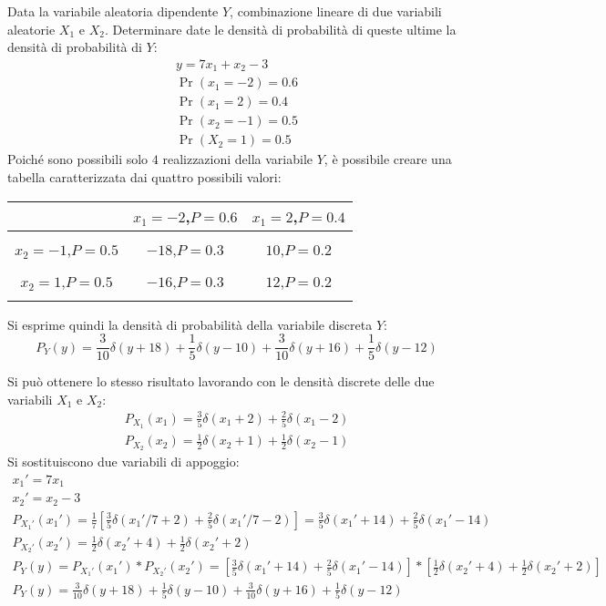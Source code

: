 \documentclass{article}
\begin{document}
Data la variabile aleatoria dipendente $Y$, combinazione lineare di due variabili aleatorie $X_1$ e $X_2$. Determinare date le densità di probabilità 
di queste ultime la densità di probabilità di $Y$:
\begin{gather*}
    y=7x_1+x_2-3\\
    \Pr(x_1=-2)=0.6\\
    \Pr(x_1=2)=0.4\\
    \Pr(x_2=-1)=0.5\\
    \Pr(X_2=1)=0.5
\end{gather*}
Poiché sono possibili solo $4$ realizzazioni della variabile $Y$, è possibile creare una tabella caratterizzata dai quattro possibili valori:
\begin{center}
    \begin{tabular}{c|c|c|}
        &$x_1=-2$,$P=0.6$&$x_1=2$,$P=0.4$\\
        \hline\\
        $x_2=-1$,$P=0.5$&$-18$,$P=0.3$&$10$,$P=0.2$\\
        \hline\\
        $x_2=1$,$P=0.5$ &$-16$,$P=0.3$ &$12$,$P=0.2$\\
        \hline\\
    \end{tabular}
\end{center}
Si esprime quindi la densità di probabilità della variabile discreta $Y$:
\begin{equation}
    P_Y(y)=\displaystyle\frac{3}{10}\delta(y+18)+\frac{1}{5}\delta(y-10)+\frac{3}{10}\delta(y+16)+\frac{1}{5}\delta(y-12)
\end{equation}

Si può ottenere lo stesso risultato lavorando con le densità discrete delle due variabili $X_1$ e $X_2$:
\begin{gather*}
    P_{X_1}(x_1)=\displaystyle\frac{3}{5}\delta(x_1+2)+\frac{2}{5}\delta(x_1-2)\\
    P_{X_2}(x_2)=\displaystyle\frac{1}{2}\delta(x_2+1)+\frac{1}{2}\delta(x_2-1)
\end{gather*}
Si sostituiscono due variabili di appoggio:
\begin{gather*}
    x_1'=7x_1\\
    x_2'=x_2-3\\
    P_{X_1'}(x_1')=\displaystyle\frac{1}{7}\left[\frac{3}{5}\delta(x_1'/7+2)+\frac{2}{5}\delta(x_1'/7-2)\right]=\frac{3}{5}\delta(x_1'+14)+\frac{2}{5}\delta(x_1'-14)\\
    P_{X_2'}(x_2')=\displaystyle\frac{1}{2}\delta(x_2'+4)+\frac{1}{2}\delta(x_2'+2)\\
    P_Y(y)=P_{X_1'}(x_1')*P_{X_2'}(x_2')=\left[\displaystyle\frac{3}{5}\delta(x_1'+14)+\frac{2}{5}\delta(x_1'-14)\right]*\left[\frac{1}{2}\delta(x_2'+4)+\frac{1}{2}\delta(x_2'+2)\right]\\
    P_Y(y)=\displaystyle\frac{3}{10}\delta(y+18)+\frac{1}{5}\delta(y-10)+\frac{3}{10}\delta(y+16)+\frac{1}{5}\delta(y-12)
\end{gather*}
\end{document}
